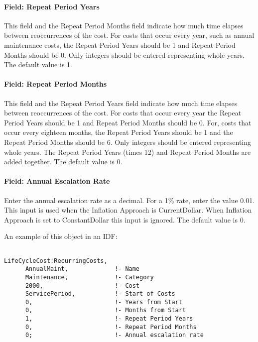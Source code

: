 \paragraph{Field: Repeat Period Years}\label{field-repeat-period-years}

This field and the Repeat Period Months field indicate how much time elapses between reoccurrences of the cost. For costs that occur every year, such as annual maintenance costs, the Repeat Period Years should be 1 and Repeat Period Months should be 0. Only integers should be entered representing whole years. The default value is 1.

\paragraph{Field: Repeat Period Months}\label{field-repeat-period-months}

This field and the Repeat Period Years field indicate how much time elapses between reoccurrences of the cost. For costs that occur every year the Repeat Period Years should be 1 and Repeat Period Months should be 0. For, costs that occur every eighteen months, the Repeat Period Years should be 1 and the Repeat Period Months should be 6. Only integers should be entered representing whole years. The Repeat Period Years (times 12) and Repeat Period Months are added together. The default value is 0.

\paragraph{Field: Annual Escalation Rate}\label{field-annual-escalation-rate}

Enter the annual escalation rate as a decimal. For a 1\% rate, enter the value 0.01. This input is used when the Inflation Approach is CurrentDollar. When Inflation Approach is set to ConstantDollar this input is ignored. The default value is 0.

An example of this object in an IDF:

\begin{lstlisting}

LifeCycleCost:RecurringCosts,
      AnnualMaint,             !- Name
      Maintenance,             !- Category
      2000,                    !- Cost
      ServicePeriod,           !- Start of Costs
      0,                       !- Years from Start
      0,                       !- Months from Start
      1,                       !- Repeat Period Years
      0,                       !- Repeat Period Months
      0;                       !- Annual escalation rate
\end{lstlisting}